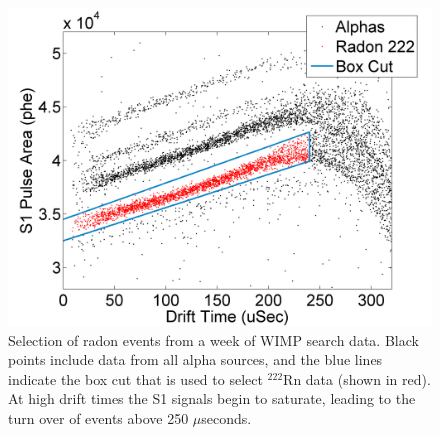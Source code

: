 \begin{figure}[h]\centering
\includegraphics[scale=0.5]{RadonSelection.png}
\caption{Selection of radon events from a week of WIMP search data.  Black points include data from all alpha sources, and the blue lines indicate the box cut that is used to select $^{222}$Rn data (shown in red). At high drift times the S1 signals begin to saturate, leading to the turn over of events above 250 $\mu$seconds.}
\label{fig:RadonSelection}
\end{figure}

